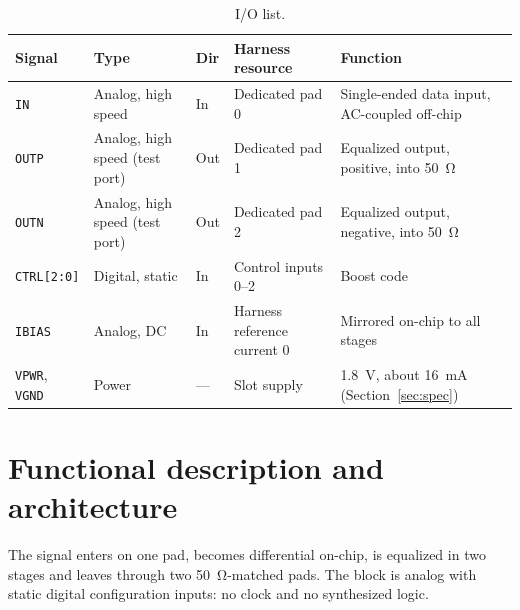 \documentclass[11pt,a4paper]{article}
\newcommand{\pin}[1]{\texttt{#1}}
\begin{document}
\begin{table}[h]
\centering\small
\caption{I/O list.}
\begin{tabularx}{\linewidth}{@{}l l l l L@{}}
\toprule
Signal & Type & Dir & Harness resource & Function \\
\midrule
\pin{IN}        & Analog, high speed & In  & Dedicated pad 0 & Single-ended data input, AC-coupled off-chip \\
\pin{OUTP}      & Analog, high speed (test port) & Out & Dedicated pad 1 & Equalized output, positive, into \SI{50}{\ohm} \\
\pin{OUTN}      & Analog, high speed (test port) & Out & Dedicated pad 2 & Equalized output, negative, into \SI{50}{\ohm} \\
\pin{CTRL[2:0]} & Digital, static    & In  & Control inputs 0--2 & Boost code \\
\pin{IBIAS}     & Analog, DC         & In  & Harness reference current 0 & Mirrored on-chip to all stages \\
\pin{VPWR}, \pin{VGND} & Power       & --- & Slot supply & \SI{1.8}{V}, about \SI{16}{mA} (Section~\ref{sec:spec}) \\
\bottomrule
\end{tabularx}
\end{table}

\section{Functional description and architecture}

The signal enters on one pad, becomes differential on-chip, is equalized
in two stages and leaves through two \SI{50}{\ohm}-matched pads. The block
is analog with static digital configuration inputs: no clock and no
synthesized logic.
\end{document}
